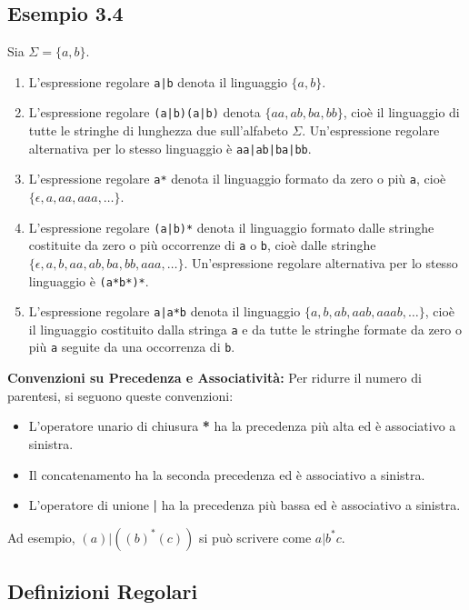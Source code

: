 \documentclass[a4paper, 11pt]{article}
\begin{document}
\subsection*{Esempio 3.4}
Sia $\Sigma = \{a, b\}$.
\begin{enumerate}
    \item L'espressione regolare \texttt{a|b} denota il linguaggio $\{a, b\}$.

    \item L'espressione regolare \texttt{(a|b)(a|b)} denota $\{aa, ab, ba, bb\}$, cioè il linguaggio di tutte le stringhe di lunghezza due sull'alfabeto $\Sigma$. Un'espressione regolare alternativa per lo stesso linguaggio è \texttt{aa|ab|ba|bb}.

    \item L'espressione regolare \texttt{a*} denota il linguaggio formato da zero o più \texttt{a}, cioè $\{\epsilon, a, aa, aaa, \dots\}$.

    \item L'espressione regolare \texttt{(a|b)*} denota il linguaggio formato dalle stringhe costituite da zero o più occorrenze di \texttt{a} o \texttt{b}, cioè dalle stringhe $\{\epsilon, a, b, aa, ab, ba, bb, aaa, \dots\}$. Un'espressione regolare alternativa per lo stesso linguaggio è \texttt{(a*b*)*}.

    \item L'espressione regolare \texttt{a|a*b} denota il linguaggio $\{a, b, ab, aab, aaab, \dots\}$, cioè il linguaggio costituito dalla stringa \texttt{a} e da tutte le stringhe formate da zero o più \texttt{a} seguite da una occorrenza di \texttt{b}.
\end{enumerate}

\textbf{Convenzioni su Precedenza e Associatività:}
Per ridurre il numero di parentesi, si seguono queste convenzioni:
\begin{itemize}
    \item L'operatore unario di chiusura \textbf{*} ha la precedenza più alta ed è associativo a sinistra.
    \item Il concatenamento ha la seconda precedenza ed è associativo a sinistra.
    \item L'operatore di unione \textbf{|} ha la precedenza più bassa ed è associativo a sinistra.
\end{itemize}
Ad esempio, $(a)|((b)^*(c))$ si può scrivere come $a|b^*c$.

\subsection{Definizioni Regolari}
\end{document}
